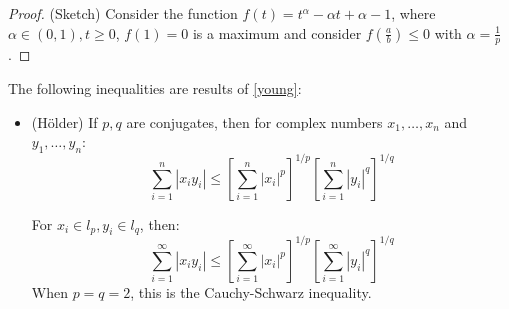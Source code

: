 \documentclass{article}
\begin{document}
\begin{proof}
    (Sketch) Consider the function $f(t) = t^{\alpha}-\alpha t+\alpha-1$, where $\alpha \in (0,1), t\geq 0$,
    $f(1)=0$ is a maximum and consider $f(\frac{a}{b})\leq 0$ with $\alpha=\frac{1}{p}$.  
\end{proof}

\begin{cor}
    The following inequalities are results of \autoref{young}:  
    \begin{itemize}
        \item (Hölder) If $p,q$ are conjugates, then for complex numbers $x_1, \dots, x_n$ and $y_1,\dots, y_n$:    
                        \begin{equation}
                            \sum_{i=1}^n |x_i y_i| \leq \left[\sum_{i=1}^n |x_i|^p\right]^{1/p} \left[\sum_{i=1}^n |y_i|^q\right]^{1/q}
                        \end{equation}  

                    For ${x_i} \in l_p, {y_i} \in l_q$, then:  
                    \begin{equation}
                        \sum_{i=1}^{\infty} |x_i y_i| \leq \left[\sum_{i=1}^{\infty} |x_i|^p\right]^{1/p} \left[\sum_{i=1}^{\infty} |y_i|^q\right]^{1/q}
                    \end{equation}  
                    When $p=q=2$, this is the Cauchy-Schwarz inequality.  


\end{itemize}
\end{cor}
\end{document}
